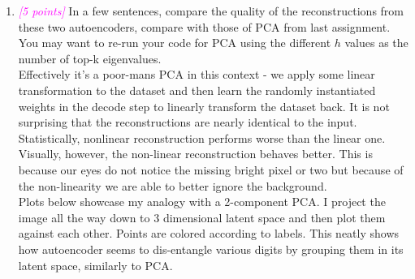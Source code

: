 \documentclass{article}
\newcommand{\1}{\mathbf{1}}
\newcommand{\points}[1]{\small\textcolor{magenta}{\emph{[#1 points]}} \normalsize}
\begin{document}
\begin{enumerate}
    \newpage
    \item \points{5} In a few sentences, compare the quality of the reconstructions from these two autoencoders, compare with those of PCA from last assignment. You may want to re-run your code for PCA using the different $h$ values as the number of top-k eigenvalues. \\
    Effectively it's a poor-mans PCA in this context - we apply some linear transformation to the dataset and then learn the randomly instantiated weights in the decode step to linearly transform the dataset back. It is not surprising that the reconstructions are nearly identical to the input. Statistically, nonlinear reconstruction performs worse than the linear one. Visually, however, the non-linear reconstruction behaves better. This is because our eyes do not notice the missing bright pixel or two but because of the non-linearity we are able to better ignore the background. \\
    Plots below showcase my analogy with a 2-component PCA. I project the image all the way down to 3 dimensional latent space and then plot them against each other. Points are colored according to labels. This neatly shows how autoencoder seems to dis-entangle various digits by grouping them in its latent space, similarly to PCA. 
    \begin{figure}[h!]
        \centering 
         \\

\end{figure}
\end{enumerate}
\end{document}
